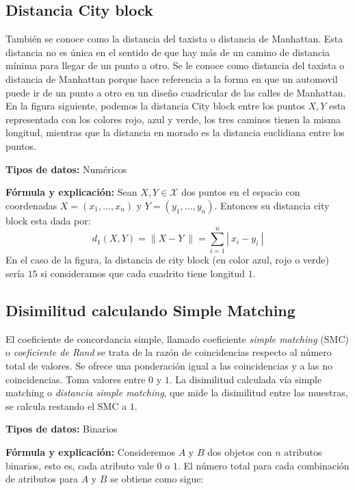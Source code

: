 \documentclass[
]{book}
\begin{document}
\subsection{Distancia City block}\label{distancia-city-block}

También se conoce como la distancia del taxista o distancia de Manhattan. Esta distancia no es única en el sentido de que hay más de un camino de distancia mínima para llegar de un punto a otro. Se le conoce como distancia del taxista o distancia de Manhattan porque hace referencia a la forma en que un automovil puede ir de un punto a otro en un diseño cuadricular de las calles de Manhattan. En la figura siguiente, podemos la distancia City block entre los puntos \(X,Y\) esta representada con los colores rojo, azul y verde, los tres caminos tienen la misma longitud, mientras que la distancia en morado es la distancia euclidiana entre los puntos.

\textbf{Tipos de datos:} Numéricos

\textbf{Fórmula y explicación:} Sean \(X,Y\in\mathcal{X}\) dos puntos en el espacio con coordenadas \(X=(x_1,...,x_{n})\) y \(Y=(y_{1},...,y_{n})\). Entonces su distancia city block esta dada por:
\[ d_{1}(X,Y) = \parallel X - Y \ \parallel = \sum_{i=1}^{n} |\ x_{i} - y_{i}\ |  \]
En el caso de la figura, la distancia de city block (en color azul, rojo o verde) sería \(15\) si consideramos que cada cuadrito tiene longitud \(1\).

\subsection{Disimilitud calculando Simple Matching}\label{disimilitud-calculando-simple-matching}

El coeficiente de concordancia simple, llamado coeficiente \emph{simple matching} (\(\mathrm{SMC}\)) o \emph{coeficiente de Rand} se trata de la razón de coincidencias respecto al número total de valores. Se ofrece una ponderación igual a las coincidencias y a las no coincidencias. Toma valores entre \(0\) y \(1\). La disimilitud calculada vía simple matching o \emph{distancia simple matching}, que mide la disimilitud entre las muestras, se calcula restando el \(\mathrm{SMC}\) a \(1\).

\textbf{Tipos de datos:} Binarios

\textbf{Fórmula y explicación:} Consideremos \(A\) y \(B\) dos objetos con \(n\) atributos binarios, esto es, cada atributo vale \(0\) o \(1\). El número total para cada combinación de atributos para \(A\) y \(B\) se obtiene como sigue:
\end{document}
